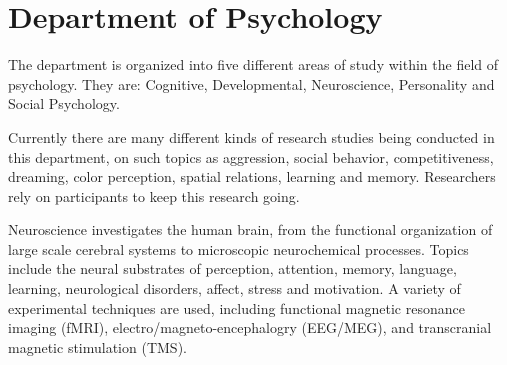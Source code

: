 \section{Department of Psychology}
\par
The department is organized into five different areas of study within the field of psychology. They are: Cognitive, Developmental, Neuroscience, Personality and Social Psychology. 
\par
Currently there are many different kinds of research studies being conducted in this department, on such topics as aggression, social behavior, competitiveness, dreaming, color perception, spatial relations, learning and memory. Researchers rely on participants to keep this research going.
\par
Neuroscience investigates the human brain, from the functional organization of large scale cerebral systems to microscopic neurochemical processes. Topics include the neural substrates of perception, attention, memory, language, learning, neurological disorders, affect, stress and motivation. A variety of experimental techniques are used, including functional magnetic resonance imaging (fMRI), electro/magneto-encephalogry (EEG/MEG), and transcranial magnetic stimulation (TMS). 

